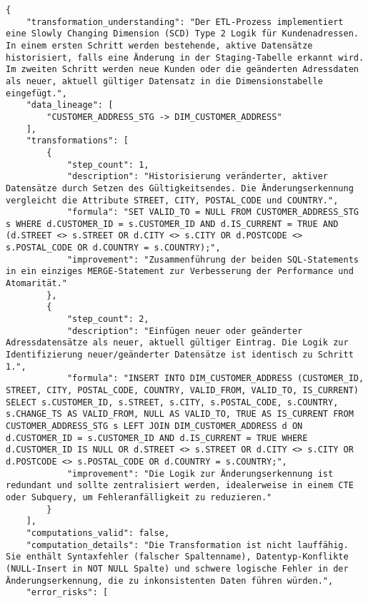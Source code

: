 \begin{lstlisting}[caption={Ausgabe: GEMINI 2.5 Pro Anwendungsfall 9 Hauptdurchlauf},label={gemini_case9_prompt1}]
{
    "transformation_understanding": "Der ETL-Prozess implementiert eine Slowly Changing Dimension (SCD) Type 2 Logik für Kundenadressen. In einem ersten Schritt werden bestehende, aktive Datensätze historisiert, falls eine Änderung in der Staging-Tabelle erkannt wird. Im zweiten Schritt werden neue Kunden oder die geänderten Adressdaten als neuer, aktuell gültiger Datensatz in die Dimensionstabelle eingefügt.",
    "data_lineage": [
        "CUSTOMER_ADDRESS_STG -> DIM_CUSTOMER_ADDRESS"
    ],
    "transformations": [
        {
            "step_count": 1,
            "description": "Historisierung veränderter, aktiver Datensätze durch Setzen des Gültigkeitsendes. Die Änderungserkennung vergleicht die Attribute STREET, CITY, POSTAL_CODE und COUNTRY.",
            "formula": "SET VALID_TO = NULL FROM CUSTOMER_ADDRESS_STG s WHERE d.CUSTOMER_ID = s.CUSTOMER_ID AND d.IS_CURRENT = TRUE AND (d.STREET <> s.STREET OR d.CITY <> s.CITY OR d.POSTCODE <> s.POSTAL_CODE OR d.COUNTRY = s.COUNTRY);",
            "improvement": "Zusammenführung der beiden SQL-Statements in ein einziges MERGE-Statement zur Verbesserung der Performance und Atomarität."
        },
        {
            "step_count": 2,
            "description": "Einfügen neuer oder geänderter Adressdatensätze als neuer, aktuell gültiger Eintrag. Die Logik zur Identifizierung neuer/geänderter Datensätze ist identisch zu Schritt 1.",
            "formula": "INSERT INTO DIM_CUSTOMER_ADDRESS (CUSTOMER_ID, STREET, CITY, POSTAL_CODE, COUNTRY, VALID_FROM, VALID_TO, IS_CURRENT) SELECT s.CUSTOMER_ID, s.STREET, s.CITY, s.POSTAL_CODE, s.COUNTRY, s.CHANGE_TS AS VALID_FROM, NULL AS VALID_TO, TRUE AS IS_CURRENT FROM CUSTOMER_ADDRESS_STG s LEFT JOIN DIM_CUSTOMER_ADDRESS d ON d.CUSTOMER_ID = s.CUSTOMER_ID AND d.IS_CURRENT = TRUE WHERE d.CUSTOMER_ID IS NULL OR d.STREET <> s.STREET OR d.CITY <> s.CITY OR d.POSTCODE <> s.POSTAL_CODE OR d.COUNTRY = s.COUNTRY;",
            "improvement": "Die Logik zur Änderungserkennung ist redundant und sollte zentralisiert werden, idealerweise in einem CTE oder Subquery, um Fehleranfälligkeit zu reduzieren."
        }
    ],
    "computations_valid": false,
    "computation_details": "Die Transformation ist nicht lauffähig. Sie enthält Syntaxfehler (falscher Spaltenname), Datentyp-Konflikte (NULL-Insert in NOT NULL Spalte) und schwere logische Fehler in der Änderungserkennung, die zu inkonsistenten Daten führen würden.",
    "error_risks": [

\end{lstlisting}
